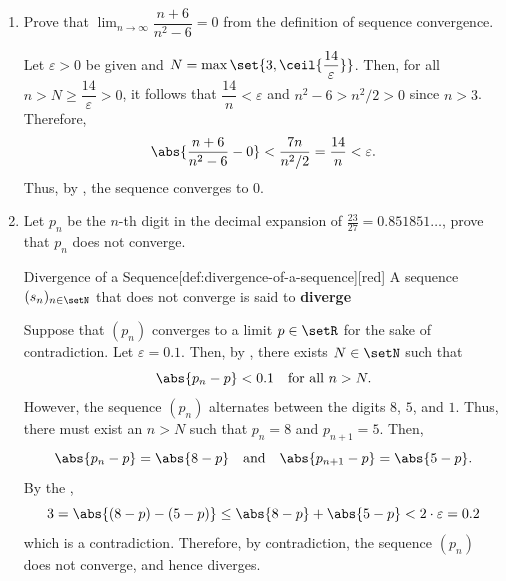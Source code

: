 \begin{enumerate}
\begin{enumerate}
    \item Prove that \(\lim_{n\to\infty}\dfrac{n+6}{n^2-6}=0\) from the definition of sequence convergence.
    \begin{subprove}
      Let \(\varepsilon>0\) be given and \(N=\max\set{3, \ceil{\dfrac{14}{\varepsilon}}}\).
      Then, for all \(n > N \ge \dfrac{14}{\varepsilon} > 0\),
      it follows that \(\dfrac{14}{n} < \varepsilon\) and \(n^2-6 > n^2/2 > 0\) since \(n > 3\).
      Therefore,
      \[
        \abs{\dfrac{n+6}{n^2-6} - 0}
        <\dfrac{7n}{n^2 / 2} = \dfrac{14}{n}
        <\varepsilon.
      \]
      Thus, by , the sequence converges to \(0\).
    \end{subprove}

    \newpage

    \item Let $p_n$ be the $n$-th digit in the decimal expansion of $\frac{23}{27}=0.851851\ldots$, 
    prove that $p_n$ does not converge.
    \begin{define}{Divergence of a Sequence}[def:divergence-of-a-sequence][red]
      A sequence \((s_n)_{n\in\setN}\) that does not converge is said to \textbf{diverge}
    \end{define}
    \begin{subprove}
      Suppose that \((p_n)\) converges to a limit \(p \in \setR\) for the sake of contradiction.
      Let \(\varepsilon = 0.1\). Then,
      by , there exists \(N \in \setN\) such that 
      \[
        \abs{p_n - p} < 0.1 \quad\text{for all } n > N.
      \]
      However, the sequence \((p_n)\) alternates between the digits \(8\), \(5\), and \(1\).
      Thus, there must exist an \(n > N\) such that \(p_{n} = 8\) and \(p_{n+1} = 5\). Then,
      \[
        \abs{p_{n} - p} = \abs{8 - p} \quad\text{and}\quad \abs{p_{n+1} - p} = \abs{5 - p}.
      \]
      By the ,
      \[
        3 = \abs{(8-p) - (5-p)} \leq \abs{8 - p} + \abs{5 - p} < 2 \cdot \varepsilon = 0.2
      \]
      which is a contradiction. Therefore, by contradiction,
      the sequence \((p_n)\) does not converge, and hence diverges.
    \end{subprove}


\end{enumerate}
\end{enumerate}
